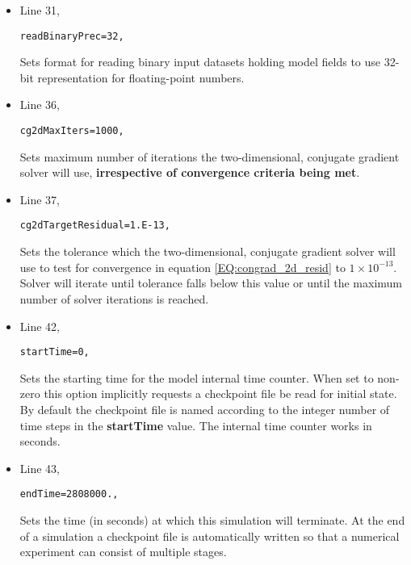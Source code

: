 {\begin{itemize}
\item Line 31,
\begin{verbatim}
readBinaryPrec=32,
\end{verbatim}
Sets format for reading binary input datasets holding model fields to
use 32-bit representation for floating-point numbers.\\

\item Line 36,
\begin{verbatim}
cg2dMaxIters=1000,
\end{verbatim}
Sets maximum number of iterations the two-dimensional, conjugate
gradient solver will use, {\bf irrespective of convergence 
criteria being met}.\\

\item Line 37,
\begin{verbatim}
cg2dTargetResidual=1.E-13,
\end{verbatim}
Sets the tolerance which the two-dimensional, conjugate
gradient solver will use to test for convergence in equation 
\ref{EQ:congrad_2d_resid} to $1 \times 10^{-13}$.
Solver will iterate until 
tolerance falls below this value or until the maximum number of
solver iterations is reached.\\

\item Line 42,
\begin{verbatim}
startTime=0,
\end{verbatim}
Sets the starting time for the model internal time counter.
When set to non-zero this option implicitly requests a 
checkpoint file be read for initial state.
By default the checkpoint file is named according to
the integer number of time steps in the {\bf startTime} value.
The internal time counter works in seconds.

\item Line 43,
\begin{verbatim}
endTime=2808000.,
\end{verbatim}
Sets the time (in seconds) at which this simulation will terminate.
At the end of a simulation a checkpoint file is automatically
written so that a numerical experiment can consist of multiple
stages.


\end{itemize}}
